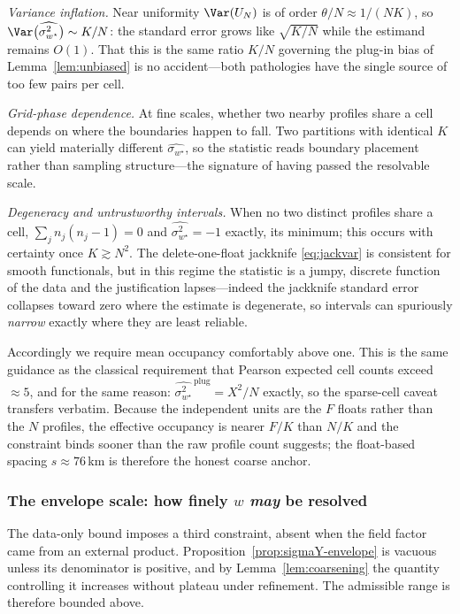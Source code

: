 \emph{Variance inflation.} Near uniformity $\Var(U_N)$ is of order
$\theta/N\approx 1/(NK)$, so
$\Var\big(\widehat{\sigma_{w^{\star}}^2}\big)\sim K/N$: the standard error
grows like $\sqrt{K/N}$ while the estimand remains $O(1)$. That this is
the same ratio $K/N$ governing the plug-in bias of
Lemma~\ref{lem:unbiased} is no accident---both pathologies have the
single source of too few pairs per cell.

\emph{Grid-phase dependence.} At fine scales, whether two nearby profiles
share a cell depends on where the boundaries happen to fall. Two
partitions with identical $K$ can yield materially different
$\widehat{\sigma_{w^{\star}}}$, so the statistic reads boundary placement
rather than sampling structure---the signature of having passed the
resolvable scale.

\emph{Degeneracy and untrustworthy intervals.} When no two distinct
profiles share a cell, $\sum_j n_j(n_j-1)=0$ and
$\widehat{\sigma_{w^{\star}}^2}=-1$ exactly, its minimum; this occurs with
certainty once $K\gtrsim N^2$. The delete-one-float jackknife
\eqref{eq:jackvar} is consistent for smooth functionals, but in this
regime the statistic is a jumpy, discrete function of the data and the
justification lapses---indeed the jackknife standard error collapses
toward zero where the estimate is degenerate, so intervals can
spuriously \emph{narrow} exactly where they are least reliable.

Accordingly we require mean occupancy comfortably above one. This is the
same guidance as the classical requirement that Pearson expected cell
counts exceed ${\approx}5$, and for the same reason:
$\widehat{\sigma_{w^{\star}}^2}^{\,\mathrm{plug}}=X^2/N$ exactly, so the
sparse-cell caveat transfers verbatim. Because the independent units are
the $F$ floats rather than the $N$ profiles, the effective occupancy is
nearer $F/K$ than $N/K$ and the constraint binds sooner than the raw
profile count suggests; the float-based spacing $s\approx76$\,km is
therefore the honest coarse anchor.

\subsubsection*{The envelope scale: how finely $w$ \emph{may} be resolved}
\label{sec:envelope-scale}

The data-only bound imposes a third constraint, absent when the field
factor came from an external product. Proposition~\ref{prop:sigmaY-envelope}
is vacuous unless its denominator is positive, and by
Lemma~\ref{lem:coarsening} the quantity controlling it increases without
plateau under refinement. The admissible range is therefore bounded
above.

